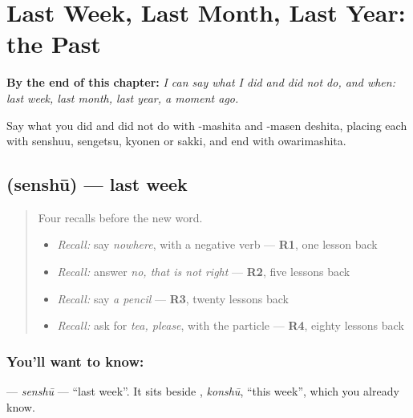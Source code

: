 
\chapter{Last Week, Last Month, Last Year: the Past}
\label{ch:ja-last-week-last-month-last-year-the-past}

\begin{chapteropening}
\textbf{By the end of this chapter:} \emph{I can say what I did and did not do, and when: last week, last month, last year, a moment ago.}

Say what you did and did not do with -mashita and -masen deshita, placing each with senshuu, sengetsu, kyonen or sakki, and end with owarimashita.
\end{chapteropening}

\section[\texorpdfstring{\ja{せんしゅう} (senshū)}{せんしゅう (senshū)}]{ (senshū) — last week}

\label{lesson:JA-C140-senshuu}



\begin{quote}
Four recalls before the new word.

\begin{itemize}
\raggedright
  \item \emph{Recall:} say \emph{nowhere}, with a negative verb — \textbf{R1}, one lesson back
  \item \emph{Recall:} answer \emph{no, that is not right} — \textbf{R2}, five lessons back
  \item \emph{Recall:} say \emph{a pencil} — \textbf{R3}, twenty lessons back
  \item \emph{Recall:} ask for \emph{tea, please}, with the particle \textbf{} — \textbf{R4}, eighty lessons back
\end{itemize}
\end{quote}

\subsection*{You'll want to know: }
\textbf{} — \emph{senshū} — \textquotedblleft{}last week\textquotedblright{}. It sits beside \textbf{}, \emph{konshū}, \textquotedblleft{}this week\textquotedblright{}, which you already know.

